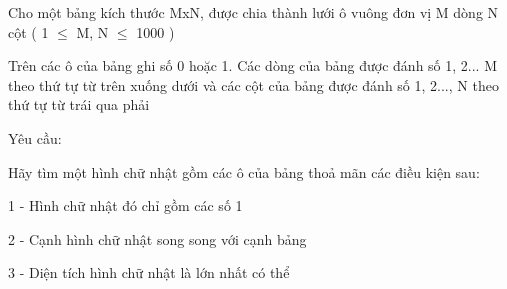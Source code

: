 Cho một bảng kích thước MxN, được chia thành lưới ô vuông đơn vị M dòng N cột ( 1  $\le$  M, N  $\le$  1000 )  

   Trên các ô của bảng ghi số 0 hoặc 1. Các dòng của bảng được đánh số 1, 2... M theo thứ tự từ trên xuống dưới và các cột của bảng được đánh số 1, 2..., N theo thứ tự từ trái qua phải  

   Yêu cầu:  

   Hãy tìm một hình chữ nhật gồm các ô của bảng thoả mãn các điều kiện sau:  

   1 - Hình chữ nhật đó chỉ gồm các số 1  

   2 - Cạnh hình chữ nhật song song với cạnh bảng  

   3 - Diện tích hình chữ nhật là lớn nhất có thể  

\